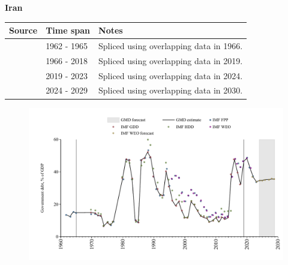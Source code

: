 \documentclass[12pt,a4paper,landscape]{article}
\begin{document}
\begin{adjustbox}{max totalsize={\paperwidth}{\paperheight},center}
\begin{minipage}[t][\textheight][t]{\textwidth}
\vspace*{0.5cm}
{}
\begin{center}
{\Large\bfseries Iran}
\end{center}
\vspace{0.5cm}
\begin{table}[H]
\centering
\small
\begin{tabular}{|l|l|l|}
\hline
\textbf{Source} & \textbf{Time span} & \textbf{Notes} \\
\hline
\rowcolor{white}\cite{IMF_FPP}& 1962 - 1965 &Spliced using overlapping data in 1966.\\
\rowcolor{lightgray}\cite{IMF_GDD}& 1966 - 2018 &Spliced using overlapping data in 2019.\\
\rowcolor{white}\cite{IMF_FPP}& 2019 - 2023 &Spliced using overlapping data in 2024.\\
\rowcolor{lightgray}\cite{IMF_WEO_forecast}& 2024 - 2029 &Spliced using overlapping data in 2030.\\
\hline
\end{tabular}
\end{table}
\begin{figure}[H]
\centering
\includegraphics[width=\textwidth,height=0.6\textheight,keepaspectratio]{graphs/IRN_govdebt_GDP.pdf}
\end{figure}
\end{minipage}
\end{adjustbox}
\end{document}
